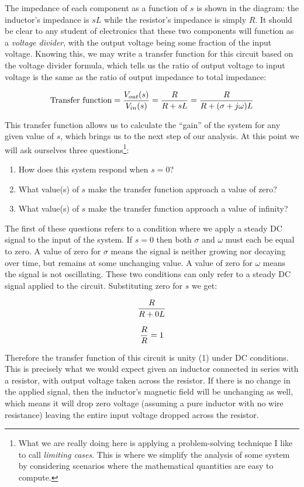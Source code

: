 The impedance of each component as a function of $s$ is shown in the diagram: the inductor's impedance is $sL$ while the resistor's impedance is simply $R$.  It should be clear to any student of electronics that these two components will function as a \textit{voltage divider}, with the output voltage being some fraction of the input voltage.  Knowing this, we may write a transfer function for this circuit based on the voltage divider formula, which tells us the ratio of output voltage to input voltage is the same as the ratio of output impedance to total impedance:

$$\hbox{Transfer function} = {V_{out}(s) \over V_{in}(s)} = {R \over {R + sL}} = {R \over {R + (\sigma + j \omega) L}}$$

This transfer function allows us to calculate the ``gain'' of the system for any given value of $s$, which brings us to the next step of our analysis.  At this point we will ask ourselves three questions\footnote{What we are really doing here is applying a problem-solving technique I like to call \textit{limiting cases}.  This is where we simplify the analysis of some system by considering scenarios where the mathematical quantities are easy to compute.}:  

\begin{enumerate}
\item How does this system respond when $s = 0$?
\item What value(s) of $s$ make the transfer function approach a value of zero?
\item What value(s) of $s$ make the transfer function approach a value of infinity?
\end{enumerate}

The first of these questions refers to a condition where we apply a steady DC signal to the input of the system.  If $s = 0$ then both $\sigma$ and $\omega$ must each be equal to zero.  A value of zero for $\sigma$ means the signal is neither growing nor decaying over time, but remains at some unchanging value.  A value of zero for $\omega$ means the signal is not oscillating.  These two conditions can only refer to a steady DC signal applied to the circuit.  Substituting zero for $s$ we get:

$${R \over {R + 0 L}}$$

$${R \over R} = 1$$

Therefore the transfer function of this circuit is unity (1) under DC conditions.  This is precisely what we would expect given an inductor connected in series with a resistor, with output voltage taken across the resistor.  If there is no change in the applied signal, then the inductor's magnetic field will be unchanging as well, which means it will drop zero voltage (assuming a pure inductor with no wire resistance) leaving the entire input voltage dropped across the resistor.

